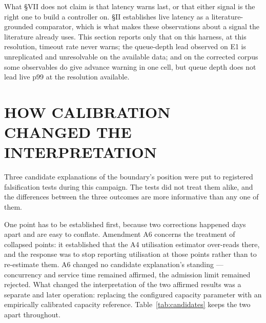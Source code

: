 \documentclass{ieeeaccess}
\begin{document}
What \S{}VII does not claim is that latency warns last, or that either signal is the right one to build a controller on. \S{}II establishes live latency as a literature-grounded comparator, which is what makes these observations about a signal the literature already uses. This section reports only that on this harness, at this resolution, timeout rate never warns; the queue-depth lead observed on E1 is unreplicated and unresolvable on the available data; and on the corrected corpus some observables do give advance warning in one cell, but queue depth does not lead live p99 at the resolution available.

\section{HOW CALIBRATION CHANGED THE INTERPRETATION}

Three candidate explanations of the boundary's position were put to registered falsification tests during this campaign. The tests did not treat them alike, and the differences between the three outcomes are more informative than any one of them.

One point has to be established first, because two corrections happened days apart and are easy to conflate. Amendment A6 concerns the treatment of collapsed points: it established that the A4 utilisation estimator over-reads there, and the response was to stop reporting utilisation at those points rather than to re-estimate them. A6 changed no candidate explanation's standing --- concurrency and service time remained affirmed, the admission limit remained rejected. What changed the interpretation of the two affirmed results was a separate and later operation: replacing the configured capacity parameter with an empirically calibrated capacity reference. Table~\ref{tab:candidates} keeps the two apart throughout.
\end{document}
